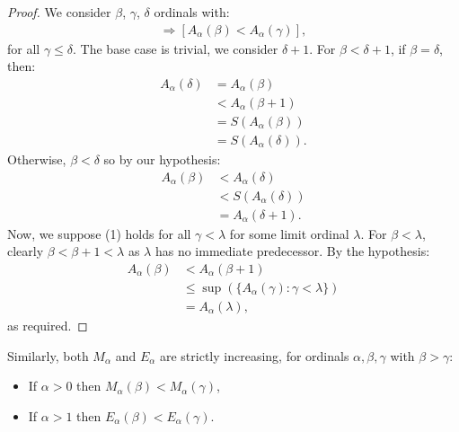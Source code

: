 \begin{proof}
    We consider $\beta$, $\gamma$, $\delta$ ordinals with: \begin{align*}
        [\beta < \gamma] \Longrightarrow [A_\alpha(\beta) < A_\alpha(\gamma)], \tag{1}
    \end{align*} for all $\gamma \leq \delta$. 
    The base case is trivial, we consider $\delta + 1$. For $\beta < \delta + 1$,
    if $\beta = \delta$, then: \begin{align*}
        A_\alpha(\delta) &= A_\alpha(\beta) \\ 
        &< A_\alpha(\beta + 1) \\
        &= S(A_\alpha(\beta)) \\
        &= S(A_\alpha(\delta)).
    \end{align*} Otherwise, $\beta < \delta$ so by our hypothesis: \begin{align*}
        A_\alpha(\beta) &< A_\alpha(\delta) \\
        &< S(A_\alpha(\delta)) \\
        &= A_\alpha(\delta + 1). 
    \end{align*} Now, we suppose (1) holds for all 
    $\gamma < \lambda$ for some limit ordinal $\lambda$. For $\beta < \lambda$,
    clearly $\beta < \beta + 1 < \lambda$ as $\lambda$ has no immediate predecessor.
    By the hypothesis: \begin{align*}
        A_\alpha(\beta) &< A_\alpha(\beta + 1) \\
        &\leq \sup(\{A_\alpha(\gamma) : \gamma < \lambda\}) \\
        &= A_\alpha(\lambda),
    \end{align*} as required.
\end{proof} \noindent
Similarly, both $M_\alpha$ and $E_\alpha$ are strictly
increasing, for ordinals $\alpha, \beta, \gamma$ with $\beta > \gamma$: 
\begin{itemize}
    \item If $\alpha > 0$ then $M_\alpha(\beta) < M_\alpha(\gamma)$,
    \item If $\alpha > 1$ then $E_\alpha(\beta) < E_\alpha(\gamma)$.
\end{itemize}
